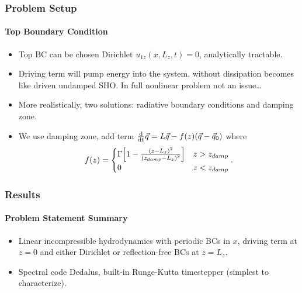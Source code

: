 \documentclass[dvipsnames]{beamer}
\newcommand*{\rd}[2]{\frac{\mathrm{d}#1}{\mathrm{d}#2}}
\DeclarePairedDelimiter\p{\lparen}{\rparen}
\DeclarePairedDelimiter\s{\lbrack}{\rbrack}
\begin{document}
\begin{frame}
    \frametitle{Problem Setup}
    \framesubtitle{Top Boundary Condition}

    \begin{itemize}
        \item Top BC can be chosen Dirichlet $u_{1z}(x, L_z, t) = 0$,
            analytically tractable.

        \item Driving term will pump energy into the system, without dissipation
            becomes like driven undamped SHO\@. In full nonlinear problem not an
            issue\dots

        \item More realistically, two solutions: radiative boundary conditions
            and damping zone.

        \item We use damping zone, add term $\rd{}{t}\vec{q} = L\vec{q}
            - f(z)\p*{\vec{q} - \vec{q}_0}$ where
            \begin{equation}
                f(z) =
                \begin{cases}
                    \Gamma \s*{
                        1 - \frac{\p*{z - L_z}^2}
                            {\p*{z_{damp} - L_z}^2}
                    }
                        & z > z_{damp}\\
                    0 & z < z_{damp}
                \end{cases}.
            \end{equation}
    \end{itemize}
\end{frame}

\begin{frame}
    \frametitle{Results}
    \framesubtitle{Problem Statement Summary}

    \begin{itemize}
        \item Linear incompressible hydrodynamics with periodic BCs in $x$,
            driving term at $z = 0$ and either Dirichlet or reflection-free BCs
            at $z = L_z$.

        \item Spectral code Dedalus, built-in Runge-Kutta timestepper (simplest
            to characterize).
    \end{itemize}
\end{frame}
\end{document}
